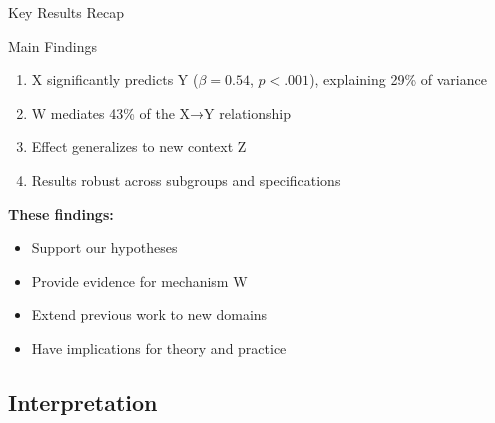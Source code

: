 \documentclass[aspectratio=169,11pt]{beamer}
\begin{document}
\begin{frame}{Key Results Recap}
  \begin{exampleblock}{Main Findings}
    \begin{enumerate}
      \item X significantly predicts Y ($\beta = 0.54$, $p < .001$), explaining 29\% of variance
      \item W mediates 43\% of the X→Y relationship
      \item Effect generalizes to new context Z
      \item Results robust across subgroups and specifications
    \end{enumerate}
  \end{exampleblock}

  \vspace{0.5cm}

  \textbf{These findings:}
  \begin{itemize}
    \item Support our hypotheses
    \item Provide evidence for mechanism W
    \item Extend previous work to new domains
    \item Have implications for theory and practice
  \end{itemize}
\end{frame}

\subsection{Interpretation}
\end{document}
